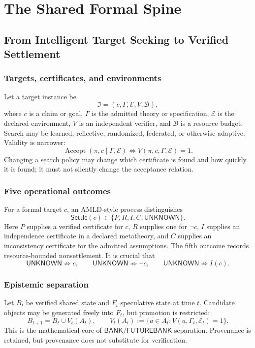 \documentclass[11pt,oneside]{book}
\theoremstyle{definition}
\theoremstyle{remark}
\newcommand{\BANK}{\mathsf{BANK}}
\newcommand{\FB}{\mathsf{FUTUREBANK}}
\newcommand{\UNKNOWN}{\mathsf{UNKNOWN}}
\newcommand{\settle}{\mathsf{Settle}}
\begin{document}
\tableofcontents

\mainmatter
\part{The Shared Formal Spine}

\chapter{From Intelligent Target Seeking to Verified Settlement}
\label{ch:spine}

\section{Targets, certificates, and environments}
Let a target instance be
\[
\mathfrak I=(c,\Gamma,\mathcal E,V,\mathcal B),
\]
where \(c\) is a claim or goal, \(\Gamma\) is the admitted theory or specification,
\(\mathcal E\) is the declared environment, \(V\) is an independent verifier, and
\(\mathcal B\) is a resource budget. Search may be learned, reflective, randomized, federated, or
otherwise adaptive. Validity is narrower:
\[
\operatorname{Accept}(\pi,c\mid\Gamma,\mathcal E)
\iff V(\pi,c,\Gamma,\mathcal E)=1.
\]
Changing a search policy may change which certificate is found and how quickly it is found; it must
not silently change the acceptance relation.

\section{Five operational outcomes}
For a formal target \(c\), an AMLD-style process distinguishes
\[
\settle(c)\in\{P,R,I,C,\UNKNOWN\}.
\]
Here \(P\) supplies a verified certificate for \(c\), \(R\) supplies one for \(\neg c\), \(I\)
supplies an independence certificate in a declared metatheory, and \(C\) supplies an inconsistency
certificate for the admitted assumptions. The fifth outcome records resource-bounded nonsettlement.
It is crucial that
\[
\UNKNOWN\not\Rightarrow c,
\qquad
\UNKNOWN\not\Rightarrow\neg c,
\qquad
\UNKNOWN\not\Rightarrow I(c).
\]

\section{Epistemic separation}
Let \(B_t\) be verified shared state and \(F_t\) speculative state at time \(t\). Candidate objects
may be generated freely into \(F_t\), but promotion is restricted:
\[
B_{t+1}=B_t\cup V_t(A_t),
\qquad
V_t(A_t):=\{a\in A_t:V(a,\Gamma_t,\mathcal E_t)=1\}.
\]
This is the mathematical core of \(\BANK/\FB\) separation. Provenance is retained, but provenance
does not substitute for verification.
\end{document}
